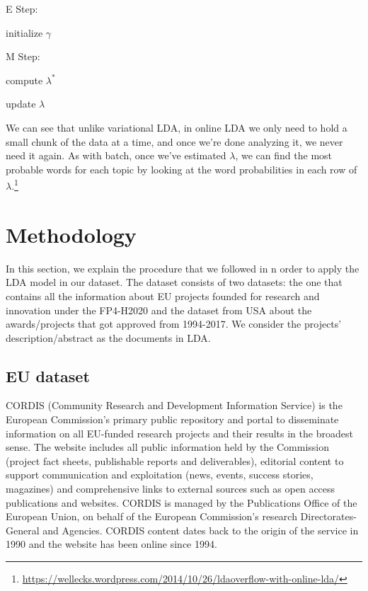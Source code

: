 \documentclass[12pt]{report}
\begin{document}
\begin{algorithm}
\SetAlgoNoLine
E Step:

initialize $\gamma$

M Step:

compute $\lambda^{*}$

update $\lambda$
\end{algorithm}

We can see that unlike variational LDA, in online LDA we only need to hold a
small chunk of the data at a time, and once we're done analyzing it, we never
need it again. As with batch, once we've estimated $\lambda$, we can find the 
most probable words for each topic by looking at the word probabilities in 
each row of $\lambda$.\footnote{\url{https://wellecks.wordpress.com/2014/10/26/ldaoverflow-with-online-lda/}}

\section{Methodology}

In this section, we explain the procedure that we followed in n order to apply
the LDA model in our dataset. The dataset consists of two datasets: the one that
contains all the information about EU projects founded for research and
innovation under the FP4-H2020 and the dataset from USA about the
awards/projects that got approved from 1994-2017. We consider the projects'
description/abstract as the documents in LDA. 

\subsection{EU dataset}

CORDIS (Community Research and Development Information Service) is the European
Commission's primary public repository and portal to disseminate information on
all EU-funded research projects and their results in the broadest sense. The
website includes all public information held by the Commission (project
fact sheets, publishable reports and deliverables), editorial content to support
communication and exploitation (news, events, success stories, magazines) and
comprehensive links to external sources such as open access publications and
websites. CORDIS is managed by the Publications Office of the European Union, on
behalf of the European Commission's research Directorates-General and Agencies.
CORDIS content dates back to the origin of the service in 1990 and the website
has been online since 1994.
\end{document}
